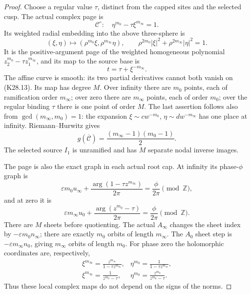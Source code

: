 \begin{proof}
Choose a regular value \(\tau\), distinct from the capped sites and
the selected cusp. The actual complex page is
\[
 \mathcal C^\circ:\quad \eta^{m_0}-\tau\xi^{m_\infty}=1.
 \tag{K28.13}
\]
Its weighted radial embedding into the above three-sphere is
\[
 (\xi,\eta)\longmapsto
       (\rho^{m_0}\xi,\rho^{m_\infty}\eta),
 \qquad
 \rho^{2m_0}|\xi|^2+\rho^{2m_\infty}|\eta|^2=1 .
 \tag{K28.14}
\]
It is the positive-argument page of the weighted homogeneous polynomial
\(z_2^{m_0}-\tau z_1^{m_\infty}\), and its map to the source base is
\[
                      t=\tau+\xi^{-m_\infty}.
 \tag{K28.15}
\]
The affine curve is smooth: its two partial derivatives cannot both
vanish on (K28.13). Its map has degree \(M\). Over infinity there are
\(m_0\) points, each of ramification order \(m_\infty\); over zero there
are \(m_\infty\) points, each of order \(m_0\); over the regular binding
\(\tau\) there is one point of order \(M\). The last assertion follows
also from \(\gcd(m_\infty,m_0)=1\): the expansion
\(\xi\sim c w^{-m_0}\), \(\eta\sim d w^{-m_\infty}\)
has one place at infinity. Riemann--Hurwitz gives
\[
                  g(\overline{\mathcal C})
                    =\frac{(m_\infty-1)(m_0-1)}2.
 \tag{K28.16}
\]
The selected source \(I_1\) is unramified and has \(M\) separate
nodal inverse images.

The page is also the exact graph in each actual root cap. At infinity
its phase-\(\phi\) graph is
\[
 \varepsilon m_0 u_\infty+
     \frac{\arg(1-\tau z^{m_\infty})}{2\pi}
           =\frac{\phi}{2\pi}\pmod{\mathbb Z},
 \tag{K28.17}
\]
and at zero it is
\[
 \varepsilon m_\infty u_0+
     \frac{\arg(z^{m_0}-\tau)}{2\pi}
           =\frac{\phi}{2\pi}\pmod{\mathbb Z}.
 \tag{K28.18}
\]
There are \(M\) sheets before quotienting. The actual \(A_\infty\)
changes the sheet index by \(-\varepsilon m_0n_\infty\);
there are exactly \(m_0\) orbits of length \(m_\infty\).
The \(A_0\) sheet step is \(-\varepsilon m_\infty n_0\),
giving \(m_\infty\) orbits of length \(m_0\). For phase zero the
holomorphic coordinates are, respectively,
\[
 \begin{array}{ll}
 \displaystyle \xi^{m_\infty}
       =\frac{z^{m_\infty}}{1-\tau z^{m_\infty}},
 &\displaystyle \eta^{m_0}
       =\frac1{1-\tau z^{m_\infty}},\\[6pt]
 \displaystyle \xi^{m_\infty}
       =\frac1{z^{m_0}-\tau},
 &\displaystyle \eta^{m_0}
       =\frac{z^{m_0}}{z^{m_0}-\tau}.
 \end{array}
 \tag{K28.19}
\]
Thus these local complex maps do not depend on the signs of the norms.


\end{proof}
